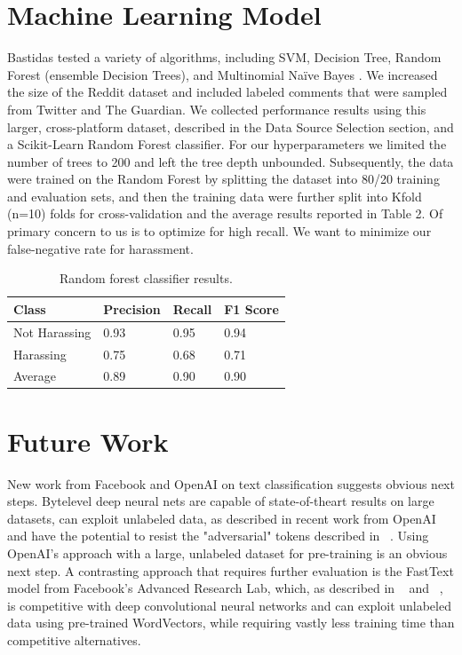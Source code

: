 \documentclass[11pt,a4paper]{article}
\begin{document}
\section{Machine Learning Model}
Bastidas tested a variety of algorithms, including
SVM, Decision Tree, Random Forest (ensemble
Decision Trees), and Multinomial Naïve Bayes
\cite{Bastidas:2016}. We increased the size of the
Reddit dataset and included labeled comments that
were sampled from Twitter and The Guardian. We
collected performance results using this larger,
cross-platform dataset, described in the Data
Source Selection section, and a Scikit-Learn Random
Forest classifier. For our hyperparameters we
limited the number of trees to 200 and left the tree
depth unbounded. Subsequently, the data were
trained on the Random Forest by splitting the dataset
into 80/20 training and evaluation sets, and
then the training data were further split into Kfold
(n=10) folds for cross-validation and the average
results reported in Table 2. Of primary concern to
us is to optimize for high recall. We want to minimize
our false-negative rate for harassment.

\begin{table}[h]
\begin{center}
\begin{tabular}{|l|l|l|l|}
\hline \bf Class & \bf Precision & \bf Recall & \bf F1 Score \\ \hline
Not Harassing & 0.93 & 0.95 & 0.94 \\
Harassing & 0.75 & 0.68 & 0.71 \\
Average & 0.89 & 0.90 & 0.90 \\
\hline
\end{tabular}
\end{center}
\caption{Random forest classifier results. }
\end{table}

\section{Future Work}
New work from Facebook and OpenAI on text
classification suggests obvious next steps. Bytelevel
deep neural nets are capable of state-of-theart
results on large datasets, can exploit unlabeled
data, as described in recent work from OpenAI
~\cite{Radford:2017} and
have the potential to resist the "adversarial" tokens
described in ~\cite{Hosseini:2017}. Using OpenAI's approach with a large,
unlabeled dataset for pre-training is an obvious
next step. A contrasting approach that requires further
evaluation is the FastText model from Facebook's
Advanced Research Lab, which, as described
in ~\cite{Joulin:2016} and ~\cite{Bojanowski:2016}, is competitive with deep convolutional
neural networks and can exploit unlabeled
data using pre-trained WordVectors, while requiring
vastly less training time than competitive
alternatives.
\end{document}
